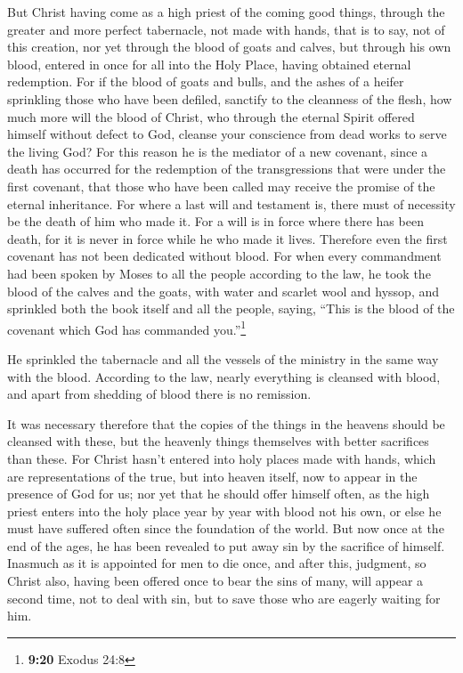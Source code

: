  But Christ having come as a high priest of the coming
good things, through the greater and more perfect tabernacle, not made
with hands, that is to say, not of this creation,  nor
yet through the blood of goats and calves, but through his own blood,
entered in once for all into the Holy Place, having obtained eternal
redemption.  For if the blood of goats and bulls, and the
ashes of a heifer sprinkling those who have been defiled, sanctify to
the cleanness of the flesh,  how much more will the blood
of Christ, who through the eternal Spirit offered himself without defect
to God, cleanse your conscience from dead works to serve the living God?
 For this reason he is the mediator of a new covenant,
since a death has occurred for the redemption of the transgressions that
were under the first covenant, that those who have been called may
receive the promise of the eternal inheritance.  For
where a last will and testament is, there must of necessity be the death
of him who made it.  For a will is in force where there
has been death, for it is never in force while he who made it lives.
 Therefore even the first covenant has not been dedicated
without blood.  For when every commandment had been
spoken by Moses to all the people according to the law, he took the
blood of the calves and the goats, with water and scarlet wool and
hyssop, and sprinkled both the book itself and all the people,
 saying, ``This is the blood of the covenant which God
has commanded you.''\footnote{\textbf{9:20} Exodus 24:8}

 He sprinkled the tabernacle and all the vessels of the
ministry in the same way with the blood.  According to
the law, nearly everything is cleansed with blood, and apart from
shedding of blood there is no remission.

 It was necessary therefore that the copies of the things
in the heavens should be cleansed with these, but the heavenly things
themselves with better sacrifices than these.  For Christ
hasn't entered into holy places made with hands, which are
representations of the true, but into heaven itself, now to appear in
the presence of God for us;  nor yet that he should offer
himself often, as the high priest enters into the holy place year by
year with blood not his own,  or else he must have
suffered often since the foundation of the world. But now once at the
end of the ages, he has been revealed to put away sin by the sacrifice
of himself.  Inasmuch as it is appointed for men to die
once, and after this, judgment,  so Christ also, having
been offered once to bear the sins of many, will appear a second time,
not to deal with sin, but to save those who are eagerly waiting for him.

